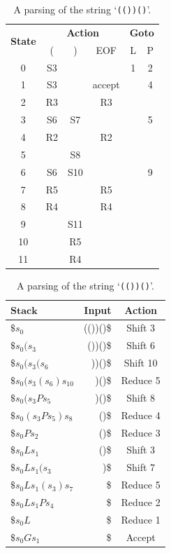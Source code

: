 \begin{table}
  \parbox{.45\linewidth}{
    \centering
    \begin{tabular}{|c|c|c|c|c|c|}
      \hline
      \multirow{2}{*}{\textbf{State}} & \multicolumn{3}{c|}{\textbf{Action}}
        & \multicolumn{2}{c|}{\textbf{Goto}}\\ \cline{2-6}
        & (  & )  & EOF    & L & P\\ \hline
      0 & S3 &    &        & 1 & 2\\ \hline
      1 & S3 &    & accept &   & 4\\ \hline
      2 & R3 &    & R3     &   &  \\ \hline
      3 & S6 & S7 &        &   & 5\\ \hline
      4 & R2 &    & R2     &   &  \\ \hline
      5 &    & S8 &        &   &  \\ \hline
      6 & S6 & S10&        &   & 9\\ \hline
      7 & R5 &    & R5     &   &  \\ \hline
      8 & R4 &    & R4     &   &  \\ \hline
      9 &    & S11&        &   &  \\ \hline
      10&    & R5 &        &   &  \\ \hline
      11&    & R4 &        &   &  \\ \hline
    \end{tabular}
    \caption{The parse table for the grammar shown in
    Figure~\ref{fig:grammar1}.}
    \label{tbl:parsetable}
  }
  \hfill
  \parbox{.45\linewidth}{
    \centering
    \begin{tabular}{|>{$}l<{$}|r|c|}
      \hline
      \textbf{Stack}        & \textbf{Input} & \textbf{Action}\\ \hline
      \$s_0                 & (())()\$       & Shift 3\\
      \$s_0(s_3             & ())()\$        & Shift 6\\
      \$s_0(s_3(s_6         & ))()\$         & Shift 10\\
      \$s_0(s_3(s_6)s_{10}  & )()\$          & Reduce 5\\
      \$s_0(s_3Ps_5         & )()\$          & Shift 8\\
      \$s_0(s_3Ps_5)s_8     & ()\$           & Reduce 4\\
      \$s_0Ps_2             & ()\$           & Reduce 3\\
      \$s_0Ls_1             & ()\$           & Shift 3\\
      \$s_0Ls_1(s_3         & )\$            & Shift 7\\
      \$s_0Ls_1(s_3)s_7     & \$             & Reduce 5\\
      \$s_0Ls_1Ps_4         & \$             & Reduce 2\\
      \$s_0L                & \$             & Reduce 1\\
      \$s_0Gs_1             & \$             & Accept\\ \hline
    \end{tabular}
    \caption{A parsing of the string `\texttt{(())()}'.}
    \label{tbl:parseexample}
  }
\end{table}

